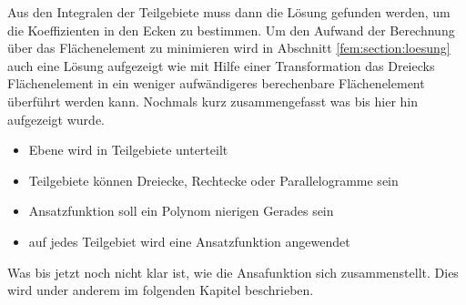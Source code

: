 Aus den Integralen der Teilgebiete muss dann die Lösung gefunden werden, um die Koeffizienten in den Ecken zu bestimmen. Um den Aufwand der Berechnung über das Flächenelement zu minimieren wird in Abschnitt \ref{fem:section:loesung} auch eine Lösung aufgezeigt wie mit Hilfe einer Transformation das Dreiecks Flächenelement in ein weniger aufwändigeres berechenbare Flächenelement überführt werden kann.
Nochmals kurz zusammengefasst was bis hier hin aufgezeigt wurde.
\begin{itemize}
	\item Ebene wird in Teilgebiete unterteilt
	\item Teilgebiete können Dreiecke, Rechtecke oder Parallelogramme sein
	\item Ansatzfunktion soll ein Polynom nierigen Gerades sein
	\item auf jedes Teilgebiet wird eine Ansatzfunktion angewendet
\end{itemize} 
Was bis jetzt noch nicht klar ist, wie die Ansafunktion sich zusammenstellt. Dies wird under anderem im folgenden Kapitel beschrieben.





